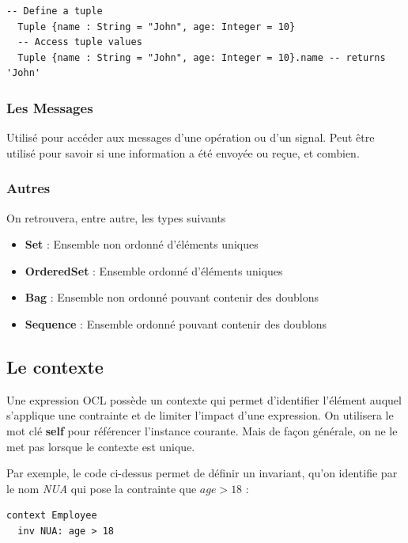 \documentclass[../Syllabus.tex]{subfiles}
\begin{document}
\begin{lstlisting}[language=OCL]
  -- Define a tuple
  Tuple {name : String = "John", age: Integer = 10}
  -- Access tuple values
  Tuple {name : String = "John", age: Integer = 10}.name -- returns 'John'
\end{lstlisting}

\subsubsection{Les Messages}

Utilisé pour accéder aux messages d'une opération ou d'un signal. Peut être utilisé pour savoir si une information a été envoyée ou reçue, et combien.

\subsubsection{Autres}

On retrouvera, entre autre, les types suivants

\begin{itemize}
  \item \textbf{Set} : Ensemble non ordonné d'éléments uniques
  \item \textbf{OrderedSet} : Ensemble ordonné d'éléments uniques
  \item \textbf{Bag} : Ensemble non ordonné pouvant contenir des doublons
  \item \textbf{Sequence} : Ensemble ordonné pouvant contenir des doublons
\end{itemize}


\subsection{Le contexte}

Une expression OCL possède un contexte qui permet d'identifier l'élément auquel s'applique une contrainte et de limiter l'impact d'une expression. On utilisera le mot clé \textbf{self} pour référencer l'instance courante. Mais de façon générale, on ne le met pas lorsque le contexte est unique.

\vspace{0.5cm}

Par exemple, le code ci-dessus permet de définir un invariant, qu'on identifie par le nom \textit{NUA} qui pose la contrainte que $age > 18$ :
\begin{lstlisting}[language=OCL]
  context Employee
  inv NUA: age > 18
\end{lstlisting}
\end{document}
